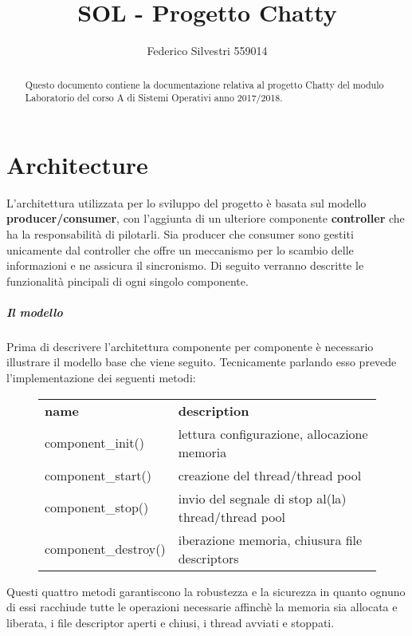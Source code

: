 \documentclass[]{article}
\title{SOL - Progetto Chatty}
\author{Federico Silvestri 559014}
\begin{document}
\maketitle


\begin{abstract}
Questo documento contiene la documentazione relativa al progetto Chatty del modulo Laboratorio del corso A di Sistemi Operativi anno 2017/2018.
\end{abstract}
\tableofcontents
\pagebreak

\section{Architecture}
L'architettura utilizzata per lo sviluppo del progetto \`e basata sul modello \textbf{producer/consumer},
con l'aggiunta di un ulteriore componente \textbf{controller} che ha la responsabilit\`a di pilotarli.
Sia producer che consumer sono gestiti unicamente dal controller che offre un meccanismo per lo scambio delle informazioni
e ne assicura il sincronismo. Di seguito verranno descritte le funzionalit\`a pincipali di ogni singolo componente.

\subparagraph[Una breve descrizione del modello]{Il modello}
Prima di descrivere l'architettura componente per componente \`e necessario illustrare il modello base che viene seguito.
Tecnicamente parlando esso prevede l'implementazione dei seguenti metodi:

\begin{figure}[H]
	\begin{table}[H]
		\begin{tabular}{ll}			
			\textbf{name} & \textbf{description} \\
			component\_init() & lettura configurazione, allocazione memoria \\
			component\_start() & creazione del thread/thread pool \\
			component\_stop() & invio del segnale di stop al(la) thread/thread pool \\
			component\_destroy() & iberazione memoria, chiusura file descriptors \\
		\end{tabular}
	\end{table}
\end{figure}

Questi quattro metodi garantiscono la robustezza e la sicurezza in quanto ognuno di essi racchiude
tutte le operazioni necessarie affinch\`e la memoria sia allocata e liberata, i file descriptor
aperti e chiusi, i thread avviati e stoppati.
\end{document}
